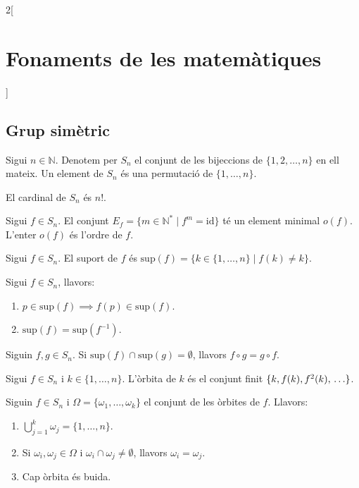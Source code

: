 \documentclass[class=article,10pt,crop=false]{standalone}
\begin{document}
\begin{multicols}{2}[\section{Fonaments de les matemàtiques}]
\subsection{Grup simètric}
\begin{definition}
Sigui $n\in\mathbb{N}$. Denotem per $S_n$ el conjunt de les bijeccions de $\{1,2,\ldots,n\}$ en ell mateix. Un element de $S_n$ és una permutació de $\{1,\ldots,n\}$.
\end{definition}
\begin{theorem}
El cardinal de $S_n$ és $n!$.
\end{theorem}
\begin{definition}
Sigui $f\in S_n$. El conjunt $E_f=\{m\in\mathbb{N}^*\mid f^m=\text{id}\}$ té un element minimal $o(f)$. L'enter $o(f)$ és l'ordre de $f$.
\end{definition}
\begin{definition}
Sigui $f\in S_n$. El suport de $f$ és $\text{sup}(f)=\{k\in\{1,\ldots,n\}\mid f(k)\ne k\}$.
\end{definition}
\begin{lemma}
Sigui $f\in S_n$, llavors:
\begin{enumerate}
    \item $p\in\text{sup}(f)\implies f(p)\in\text{sup}(f)$.
    \item $\text{sup}(f)=\text{sup}(f^{-1})$.
\end{enumerate}
\end{lemma}
\begin{lemma}
Siguin $f,g\in S_n$. Si $\text{sup}(f)\cap\text{sup}(g)=\emptyset$, llavors $f\circ g=g\circ f$.
\end{lemma}
\begin{definition}
Sigui $f\in S_n$ i $k\in\{1,\ldots,n\}$. L'òrbita de $k$ és el conjunt finit $\{k,f(k),f^2(k),\\ \ldots\}$.
\end{definition}
\begin{theorem}
Siguin $f\in S_n$ i $\Omega=\{\omega_1,\ldots,\omega_k\}$ el conjunt de les òrbites de $f$. Llavors:
\begin{enumerate}
    \item $\bigcup_{j=1}^k \omega_j=\{1,\ldots,n\}$.
    \item Si $\omega_i,\omega_j\in\Omega$ i $\omega_i\cap\omega_j\ne\emptyset$, llavors $\omega_i=\omega_j$.
    \item Cap òrbita és buida.
\end{enumerate}
\end{theorem}

\end{multicols}
\end{document}
